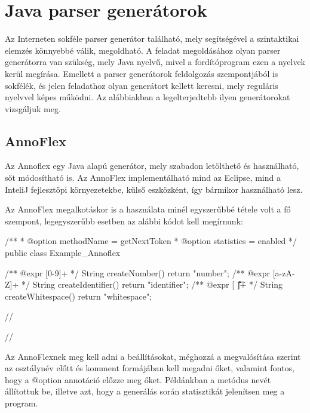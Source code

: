 


\section{Java parser generátorok}

Az Interneten sokféle parser generátor található, mely segítségével a szintaktikai elemzés könnyebbé válik, megoldható.
A feladat megoldásához olyan parser generátorra van szükség, mely Java nyelvű, mivel a fordítóprogram ezen a nyelvek kerül megírása.
Emellett a parser generátorok feldolgozás szempontjából is sokfélék, és jelen feladathoz olyan generátort kellett keresni, mely reguláris nyelvvel képes működni.
Az alábbiakban a legelterjedtebb ilyen generátorokat vizsgáljuk meg.

\subsection{AnnoFlex}

Az Annoflex egy Java alapú generátor, mely szabadon letölthető és használható, sőt módosítható is. Az AnnoFlex implementálható mind az Eclipse, mind a InteliJ fejlesztőpi környezetekbe, külső eszközként, így bármikor használható lesz.

Az AnnoFlex megalkotáskor is a használata minél egyszerűbbé tétele volt a fő szempont, legegyszerűbb esetben az alábbi kódot kell megírnunk:

\begin{java}
/**
* @option methodName = getNextToken
* @option statistics = enabled
*/
public class Example_Annoflex {
/** @expr [0-9]+       */ String createNumber()     { return "number"; }
/** @expr [a-zA-Z]+    */ String createIdentifier() { return "identifier"; }
/** @expr [ \n\r\t\f]+ */ String createWhitespace() { return "whitespace"; }

//%


//%
}
\end{java}

Az AnnoFlexnek meg kell adni a beállításokat, méghozzá a megvalósítása szerint az osztálynév előtt és komment formájában kell megadni őket, valamint fontos, hogy a @option annotáció előzze meg őket. Példánkban a metódus nevét állítottuk be, illetve azt, hogy a generálás során statisztikát jelenítsen meg a program.

